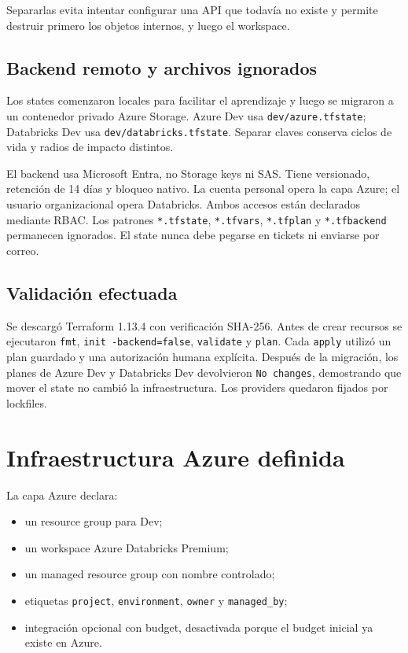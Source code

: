 \documentclass[11pt,a4paper]{article}
\begin{document}
Separarlas evita intentar configurar una API que todavía no existe y permite destruir primero los
objetos internos, y luego el workspace.

\subsection{Backend remoto y archivos ignorados}

Los states comenzaron locales para facilitar el aprendizaje y luego se migraron a un contenedor
privado Azure Storage. Azure Dev usa \texttt{dev/azure.tfstate}; Databricks Dev usa
\texttt{dev/databricks.tfstate}. Separar claves conserva ciclos de vida y radios de impacto distintos.

El backend usa Microsoft Entra, no Storage keys ni SAS. Tiene versionado, retención de 14 días y
bloqueo nativo. La cuenta personal opera la capa Azure; el usuario organizacional opera Databricks.
Ambos accesos están declarados mediante RBAC. Los patrones \texttt{*.tfstate}, \texttt{*.tfvars},
\texttt{*.tfplan} y \texttt{*.tfbackend} permanecen ignorados. El state nunca debe pegarse en tickets
ni enviarse por correo.

\subsection{Validación efectuada}

Se descargó Terraform 1.13.4 con verificación SHA-256. Antes de crear recursos se ejecutaron
\texttt{fmt}, \texttt{init -backend=false}, \texttt{validate} y \texttt{plan}. Cada \texttt{apply}
utilizó un plan guardado y una autorización humana explícita. Después de la migración, los planes de
Azure Dev y Databricks Dev devolvieron \texttt{No changes}, demostrando que mover el state no cambió
la infraestructura. Los providers quedaron fijados por lockfiles.

\section{Infraestructura Azure definida}

La capa Azure declara:

\begin{itemize}
  \item un resource group para Dev;
  \item un workspace Azure Databricks Premium;
  \item un managed resource group con nombre controlado;
  \item etiquetas \texttt{project}, \texttt{environment}, \texttt{owner} y \texttt{managed\_by};
  \item integración opcional con budget, desactivada porque el budget inicial ya existe en Azure.
\end{itemize}
\end{document}
